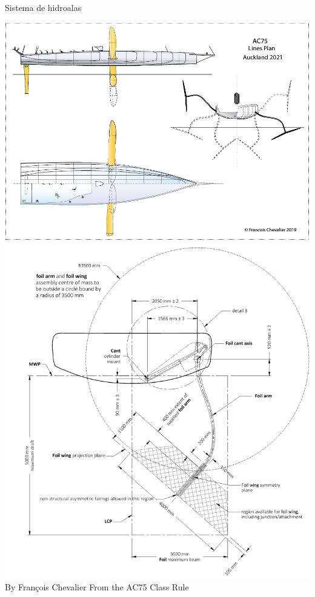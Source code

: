 \documentclass[presentation,aspectratio=169]{beamer}
\begin{document}
\begin{frame}[label={sec:org4e6f287}]{Sistema de hidroalas}
 \begin{center}
\includegraphics[height=0.6\textheight]{../../figures/AC75-lines.png}
\includegraphics[height=0.7\textheight]{../../figures/AC75-class-foil.png}\\
{\footnotesize  By François Chevalier \hfill From the AC75 Class Rule}
\end{center}
\end{frame}
\end{document}
